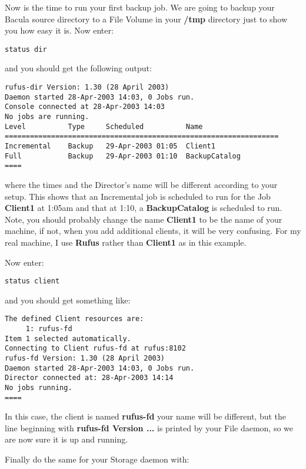 Now is the time to run your first backup job. We are going to backup your
Bacula source directory to a File Volume in your {\bf /tmp} directory just to
show you how easy it is. Now enter: 

\footnotesize
\begin{verbatim}
status dir
\end{verbatim}
\normalsize

and you should get the following output: 

\footnotesize
\begin{verbatim}
rufus-dir Version: 1.30 (28 April 2003)
Daemon started 28-Apr-2003 14:03, 0 Jobs run.
Console connected at 28-Apr-2003 14:03
No jobs are running.
Level          Type     Scheduled          Name
=================================================================
Incremental    Backup   29-Apr-2003 01:05  Client1
Full           Backup   29-Apr-2003 01:10  BackupCatalog
====
\end{verbatim}
\normalsize

where the times and the Director's name will be different according to your
setup. This shows that an Incremental job is scheduled to run for the Job {\bf
Client1} at 1:05am and that at 1:10, a {\bf BackupCatalog} is scheduled to
run. Note, you should probably change the name {\bf Client1} to be the name of
your machine, if not, when you add additional clients, it will be very
confusing. For my real machine, I use {\bf Rufus} rather than {\bf Client1} as
in this example. 

Now enter: 

\footnotesize
\begin{verbatim}
status client
\end{verbatim}
\normalsize

and you should get something like: 

\footnotesize
\begin{verbatim}
The defined Client resources are:
     1: rufus-fd
Item 1 selected automatically.
Connecting to Client rufus-fd at rufus:8102
rufus-fd Version: 1.30 (28 April 2003)
Daemon started 28-Apr-2003 14:03, 0 Jobs run.
Director connected at: 28-Apr-2003 14:14
No jobs running.
====
\end{verbatim}
\normalsize

In this case, the client is named {\bf rufus-fd} your name will be different,
but the line beginning with {\bf rufus-fd Version ...} is printed by your File
daemon, so we are now sure it is up and running. 

Finally do the same for your Storage daemon with: 


